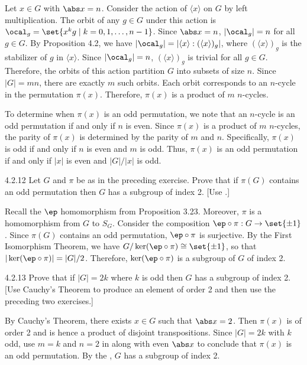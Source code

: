 \begin{sol}
	Let $x \in G$ with $\abs x = n$.
	Consider the action of $\langle x \rangle$ on $G$ by left multiplication.
	The orbit of any $g \in G$ under this action is $\ocal_g = \set{x^k g \mid k = 0, 1, \ldots, n-1}$.
	Since $\abs x = n$, $|\ocal_g| = n$ for all $g \in G$.
	By Proposition 4.2, we have $|\ocal_g| = |\langle x \rangle : (\langle x \rangle)_g|$, where $(\langle x \rangle)_g$ is the stabilizer of $g$ in $\langle x \rangle$.
	Since $|\ocal_g| = n$, $(\langle x \rangle)_g$ is trivial for all $g \in G$.
	Therefore, the orbits of this action partition $G$ into subsets of size $n$.
	Since $|G| = mn$, there are exactly $m$ such orbits.
	Each orbit corresponds to an $n$-cycle in the permutation $\pi(x)$.
	Therefore, $\pi(x)$ is a product of $m$ $n$-cycles.

	To determine when $\pi(x)$ is an odd permutation, we note that an $n$-cycle is an odd permutation if and only if $n$ is even.
	Since $\pi(x)$ is a product of $m$ $n$-cycles, the parity of $\pi(x)$ is determined by the parity of $m$ and $n$.
	Specifically, $\pi(x)$ is odd if and only if $n$ is even and $m$ is odd.
	Thus, $\pi(x)$ is an odd permutation if and only if $|x|$ is even and $|G|/|x|$ is odd.
\end{sol}

\begin{exercise}{4.2.12}
	Let $G$ and $\pi$ be as in the preceding exercise.
	Prove that if $\pi(G)$ contains an odd permutation then $G$ has a subgroup of index 2. [Use .]
\end{exercise}

\begin{sol}
	Recall the $\ep$ homomorphism from Proposition 3.23.
	Moreover, $\pi$ is a homomorphism from $G$ to $S_G$.
	Consider the composition $\ep \circ \pi : G \to \set{\pm 1}$.
	Since $\pi(G)$ contains an odd permutation, $\ep \circ \pi$ is surjective.
	By the First Isomorphism Theorem, we have $G/\ker(\ep \circ \pi) \cong \set{\pm 1}$, so that $|\ker(\ep \circ \pi)| = |G|/2$.
	Therefore, $\ker(\ep \circ \pi)$ is a subgroup of $G$ of index 2.
\end{sol}

\begin{exercise}{4.2.13}
	Prove that if $|G| = 2k$ where $k$ is odd then $G$ has a subgroup of index 2. [Use Cauchy's Theorem to produce an element of order 2 and then use the preceding two exercises.]
\end{exercise}

\begin{sol}
	By Cauchy's Theorem, there exists $x \in G$ such that $\abs x = 2$.
	Then $\pi(x)$ is of order 2 and is hence a product of disjoint transpositions.
	Since $|G| = 2k$ with $k$ odd, use $m = k$ and $n = 2$ in  along with even $\abs x$ to conclude that $\pi(x)$ is an odd permutation.
	By the , $G$ has a subgroup of index 2.
\end{sol}

